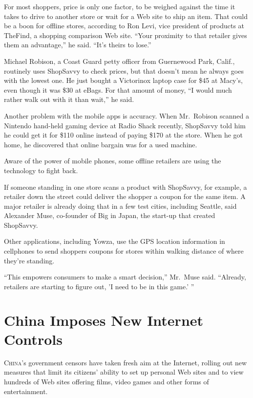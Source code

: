 ﻿\documentclass[12pt]{article}
\begin{document}
For most shoppers, price is only one factor, to be weighed against the time it takes to drive to
another store or wait for a Web site to ship an item. That could be a boon for offline stores,
according to Ron Levi, vice president of products at TheFind, a shopping comparison Web site. ``Your
proximity to that retailer gives them an advantage,'' he said. ``It's theirs to lose.''

Michael Robison, a Coast Guard petty officer from Guernewood Park, Calif., routinely uses ShopSavvy
to check prices, but that doesn't mean he always goes with the lowest one. He just bought a
Victorinox laptop case for \$45 at Macy's, even though it was \$30 at eBags. For that amount of
money, ``I would much rather walk out with it than wait,'' he said.

Another problem with the mobile apps is accuracy. When Mr.~Robison scanned a Nintendo hand-held
gaming device at Radio Shack recently, ShopSavvy told him he could get it for \$110 online instead
of paying \$170 at the store. When he got home, he discovered that online bargain was for a used
machine.

Aware of the power of mobile phones, some offline retailers are using the technology to fight back.

If someone standing in one store scans a product with ShopSavvy, for example, a retailer down the
street could deliver the shopper a coupon for the same item. A major retailer is already doing that
in a few test cities, including Seattle, said Alexander Muse, co-founder of Big in Japan, the
start-up that created ShopSavvy.

Other applications, including Yowza, use the GPS location information in cellphones to send shoppers
coupons for stores within walking distance of where they're standing.

``This empowers consumers to make a smart decision,'' Mr.~Muse said. ``Already, retailers are
starting to figure out, 'I need to be in this game.' ''

\section{China Imposes New Internet Controls}

\lettrine{C}{hina}'s government censors have taken fresh aim at the
Internet, rolling out new measures that limit its citizens' ability to set up personal Web sites and
to view hundreds of Web sites offering films, video games and other forms of entertainment.
\end{document}
